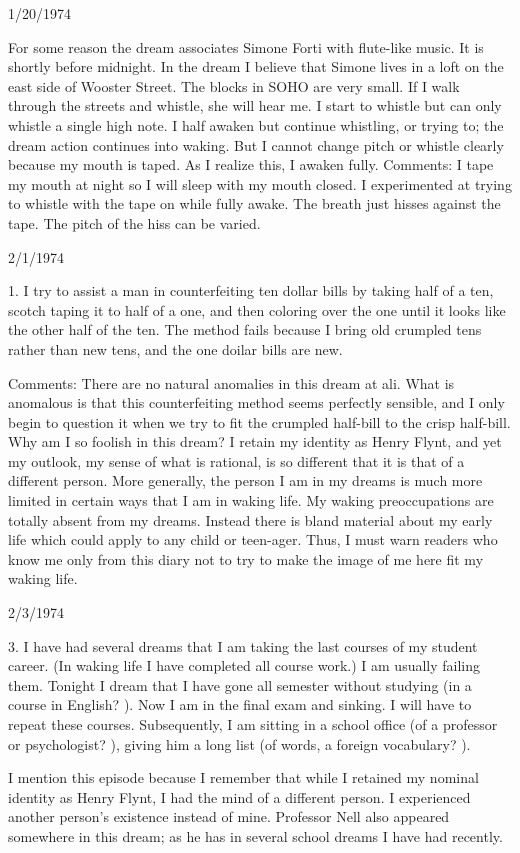 \documentclass[10pt,twoside]{memoir}
\begin{document}
\begin{enumerate}
{1/20/1974 

For some reason the dream associates Simone Forti with flute-like 
music. It is shortly before midnight. In the dream I believe that Simone lives 
in a loft on the east side of Wooster Street. The blocks in SOHO are very 
small. If I walk through the streets and whistle, she will hear me. I start to 
whistle but can only whistle a single high note. I half awaken but continue 
whistling, or trying to; the dream action continues into waking. But I cannot 
change pitch or whistle clearly because my mouth is taped. As I realize this, I 
awaken fully. 
Comments: I tape my mouth at night so I will sleep with my mouth closed. I 
experimented at trying to whistle with the tape on while fully awake. The 
breath just hisses against the tape. The pitch of the hiss can be varied. 


2/1/1974 

1. I try to assist a man in counterfeiting ten dollar bills by taking half 
of a ten, scotch taping it to half of a one, and then coloring over the one 
until it looks like the other half of the ten. The method fails because I bring 
old crumpled tens rather than new tens, and the one doilar bills are new. 


Comments: There are no natural anomalies in this dream at ali. What is 
anomalous is that this counterfeiting method seems perfectly sensible, and I 
only begin to question it when we try to fit the crumpled half-bill to the 
crisp half-bill. Why am I so foolish in this dream? I retain my identity as 
Henry Flynt, and yet my outlook, my sense of what is rational, is so 
different that it is that of a different person. More generally, the person I am 
in my dreams is much more limited in certain ways that I am in waking life. 
My waking preoccupations are totally absent from my dreams. Instead there 
is bland material about my early life which could apply to any child or 
teen-ager. Thus, I must warn readers who know me only from this diary not 
to try to make the image of me here fit my waking life. 


2/3/1974 

3. I have had several dreams that I am taking the last courses of my 
student career. (In waking life I have completed all course work.) I am 
usually failing them. Tonight I dream that I have gone all semester without 
studying (in a course in English? ). Now I am in the final exam and sinking. I 
will have to repeat these courses. Subsequently, I am sitting in a school 
office (of a professor or psychologist? ), giving him a long list (of words, a 
foreign vocabulary? ). {I mention this episode because I remember that while 
I retained my nominal identity as Henry Flynt, I had the mind of a different 
person. I experienced another person's existence instead of mine. Professor 
Nell also appeared somewhere in this dream; as he has in several school 
dreams I have had recently. 


}}
\end{enumerate}
\end{document}
